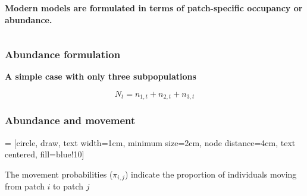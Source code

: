 \documentclass[color=usenames,dvipsnames]{beamer}\usepackage[]{graphicx}\usepackage[]{color}
\begin{document}
\begin{frame}
\begin{columns}
\begin{column}{0.7\textwidth}
      \pause
      \vspace{1cm}
      {\bf Modern models are formulated in terms of patch-specific
        \alert{occupancy} or \alert{abundance}. \par}
    \end{column}
  \end{columns}
\end{frame}







\begin{frame}
  \frametitle{Abundance formulation}
  \Large
  {\centering \bf A simple case with only three subpopulations \par}
  \[
    N_t = n_{1,t} + n_{2,t} + n_{3,t}
  \]
\end{frame}





\begin{frame}
  \frametitle{Abundance and movement}
   = [circle, draw, text width=1cm, minimum size=2cm,
    node distance=4cm, text centered, fill=blue!10]
    \begin{center}
    \end{center}
    The movement probabilities ($\pi_{i,j}$) indicate the proportion of
    individuals moving from patch $i$ to patch $j$
\end{frame}
\end{document}
